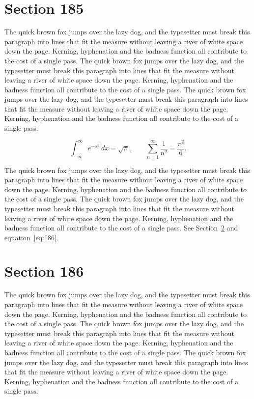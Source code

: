 \documentclass{article}
\begin{document}
\section{Section 185}
\label{sec:185}
The quick brown fox jumps over the lazy dog, and the typesetter must break this paragraph into lines that fit the measure without leaving a river of white space down the page. Kerning, hyphenation and the badness function all contribute to the cost of a single pass. The quick brown fox jumps over the lazy dog, and the typesetter must break this paragraph into lines that fit the measure without leaving a river of white space down the page. Kerning, hyphenation and the badness function all contribute to the cost of a single pass. The quick brown fox jumps over the lazy dog, and the typesetter must break this paragraph into lines that fit the measure without leaving a river of white space down the page. Kerning, hyphenation and the badness function all contribute to the cost of a single pass. 

\begin{equation}\label{eq:185}
\int_{-\infty}^{\infty} e^{-x^{2}}\,dx = \sqrt{\pi}, \qquad
\sum_{n=1}^{\infty} \frac{1}{n^{2}} = \frac{\pi^{2}}{6}.
\end{equation}

The quick brown fox jumps over the lazy dog, and the typesetter must break this paragraph into lines that fit the measure without leaving a river of white space down the page. Kerning, hyphenation and the badness function all contribute to the cost of a single pass. The quick brown fox jumps over the lazy dog, and the typesetter must break this paragraph into lines that fit the measure without leaving a river of white space down the page. Kerning, hyphenation and the badness function all contribute to the cost of a single pass. 
See Section~\ref{sec:186} and equation~\eqref{eq:186}.
\section{Section 186}
\label{sec:186}
The quick brown fox jumps over the lazy dog, and the typesetter must break this paragraph into lines that fit the measure without leaving a river of white space down the page. Kerning, hyphenation and the badness function all contribute to the cost of a single pass. The quick brown fox jumps over the lazy dog, and the typesetter must break this paragraph into lines that fit the measure without leaving a river of white space down the page. Kerning, hyphenation and the badness function all contribute to the cost of a single pass. The quick brown fox jumps over the lazy dog, and the typesetter must break this paragraph into lines that fit the measure without leaving a river of white space down the page. Kerning, hyphenation and the badness function all contribute to the cost of a single pass. 
\end{document}
